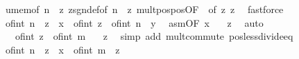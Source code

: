\begin{isabellebody}
\ u{\isacharunderscore}{\kern0pt}mem{\isacharbrackleft}{\kern0pt}of\ {\isachardoublequoteopen}n\ {\isacharasterisk}{\kern0pt}\ z{\isachardoublequoteclose}{\isacharbrackright}{\kern0pt}\ zsgn{\isacharunderscore}{\kern0pt}def{\isacharbrackleft}{\kern0pt}of\ {\isachardoublequoteopen}n\ {\isacharasterisk}{\kern0pt}\ z{\isachardoublequoteclose}{\isacharbrackright}{\kern0pt}\ mult{\isacharunderscore}{\kern0pt}pos{\isacharunderscore}{\kern0pt}pos{\isacharbrackleft}{\kern0pt}OF\ {\isacharasterisk}{\kern0pt}{\isacharparenleft}{\kern0pt}{}{\isacharparenright}{\kern0pt}{\isacharcomma}{\kern0pt}\ of\ z{\isacharbrackright}{\kern0pt}\ z{\isacharparenleft}{\kern0pt}{}{\isacharparenright}{\kern0pt}\ \isamarkupfalse%
\ fastforce\isanewline
\ \ \ \ \isanewline
\ \ \ \ \isamarkupfalse%
\ {\isachardoublequoteopen}of{\isacharunderscore}{\kern0pt}int\ {\isacharparenleft}{\kern0pt}n\ {\isacharasterisk}{\kern0pt}\ z{\isacharparenright}{\kern0pt}\ {\isacharasterisk}{\kern0pt}\ x\ {\isasymle}\ of{\isacharunderscore}{\kern0pt}int\ z\ {\isacharasterisk}{\kern0pt}\ of{\isacharunderscore}{\kern0pt}int\ n\ {\isacharasterisk}{\kern0pt}\ y{\isachardoublequoteclose}\ \isamarkupfalse%
\ asm{\isacharbrackleft}{\kern0pt}OF\ x{\isacharparenleft}{\kern0pt}{}{\isacharparenright}{\kern0pt}{\isacharbrackright}{\kern0pt}\ \isamarkupfalse%
\ {\isacharasterisk}{\kern0pt}\ z\ \isamarkupfalse%
\ auto\isanewline
\ \ \ \ \isamarkupfalse%
\ \isamarkupfalse%
\ {\isachardoublequoteopen}{\isachardot}{\kern0pt}{\isachardot}{\kern0pt}{\isachardot}{\kern0pt}\ {\isacharless}{\kern0pt}\ of{\isacharunderscore}{\kern0pt}int\ z\ {\isacharasterisk}{\kern0pt}\ of{\isacharunderscore}{\kern0pt}int\ m{\isachardoublequoteclose}\ \isamarkupfalse%
\ {\isacharasterisk}{\kern0pt}\ z\ \isamarkupfalse%
\ {\isacharparenleft}{\kern0pt}simp\ add{\isacharcolon}{\kern0pt}\ mult{\isachardot}{\kern0pt}commute\ pos{\isacharunderscore}{\kern0pt}less{\isacharunderscore}{\kern0pt}divide{\isacharunderscore}{\kern0pt}eq{\isacharparenright}{\kern0pt}\isanewline
\ \ \ \ \isamarkupfalse%
\ \isamarkupfalse%
\ {\isachardoublequoteopen}of{\isacharunderscore}{\kern0pt}int\ {\isacharparenleft}{\kern0pt}n\ {\isacharasterisk}{\kern0pt}\ z{\isacharparenright}{\kern0pt}\ {\isacharasterisk}{\kern0pt}\ x\ {\isacharless}{\kern0pt}\ of{\isacharunderscore}{\kern0pt}int\ {\isacharparenleft}{\kern0pt}m\ {\isacharasterisk}{\kern0pt}\ z{\isacharparenright}{\kern0pt}{\isachardoublequoteclose}\ \isamarkupfalse%

\end{isabellebody}
